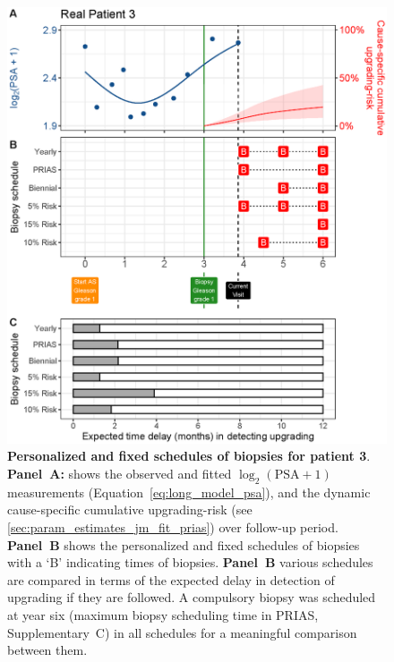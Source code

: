 \begin{figure}
\centerline{\includegraphics[width=\columnwidth]{images/demo_pat3_supp.eps}}
\caption{\textbf{Personalized and fixed schedules of biopsies for patient 3}. \textbf{Panel~A:} shows the observed and fitted $\log_2(\mbox{PSA} + 1)$ measurements (Equation~\ref{eq:long_model_psa}), and the dynamic cause-specific cumulative upgrading-risk (see \ref{sec:param_estimates_jm_fit_prias}) over follow-up period. \textbf{Panel~B} shows the personalized and fixed schedules of biopsies with a `B' indicating times of biopsies. \textbf{Panel~B} various schedules are compared in terms of the expected delay in detection of upgrading if they are followed. A compulsory biopsy was scheduled at year six (maximum biopsy scheduling time in PRIAS, Supplementary~C) in all schedules for a meaningful comparison between them.}
\label{fig:demo_pat3_supp}
\end{figure}